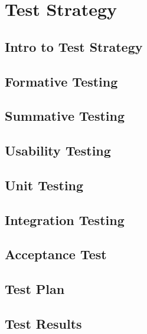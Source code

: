 \chapter{Test Strategy}
\section{Intro to Test Strategy}
\section{Formative Testing}
\section{Summative Testing}
\section{Usability Testing}
\section{Unit Testing}
\section{Integration Testing}
\section{Acceptance Test}
\section{Test Plan}
\section{Test Results}